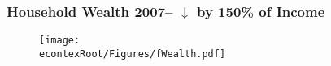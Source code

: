   \begin{frame}
    \frametitle{\textbf{Household Wealth 2007--  $\boldsymbol{\downarrow}$ by 150\% of Income}}

    \begin{figure}
      \texttt{[image: \\econtexRoot/Figures/fWealth.pdf]}
    \end{figure}
  \end{frame}
